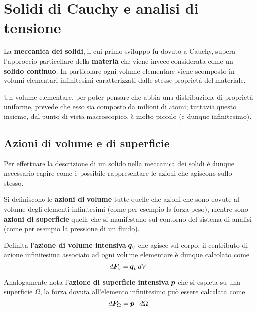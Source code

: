 \chapter{Solidi di Cauchy e analisi di tensione}
	
	La \textbf{meccanica dei solidi}, il cui primo sviluppo fu dovuto a Cauchy, supera l'approccio particellare della \textbf{materia} che viene invece considerata come un \textbf{solido continuo}. In particolare ogni volume elementare viene scomposto in volumi elementari infinitesimi caratterizzati dalle stesse proprietà del materiale.
	
	\begin{nota}
		Un volume elementare, per poter pensare che abbia una distribuzione di proprietà uniforme, prevede che esso sia composto da milioni di atomi; tuttavia questo insieme, dal punto di vista macroscopico, è molto piccolo (e dunque infinitesimo).
	\end{nota}

\section{Azioni di volume e di superficie}
	Per effettuare la descrizione di un solido nella meccanica dei solidi è dunque necessario capire come è possibile rappresentare le azioni che agiscono sullo stesso.
	\begin{concetto}
		Si definiscono le \textbf{azioni di volume} tutte quelle che azioni che sono dovute al volume degli elementi infinitesimi (come per esempio la forza peso), mentre sono \textbf{azioni di superficie} quelle che si manifestano sul contorno del sistema di analisi (come per esempio la pressione di un fluido).
		
		\vspace{3mm}
		
		Definita l'\textbf{azione di volume intensiva} $\boldsymbol{q}_v$ che agisce sul corpo, il contributo di azione infinitesima associato ad ogni volume elementare è dunque calcolato come
		\begin{equation}
			d\boldsymbol{F}_v = \boldsymbol{q}_v \, dV
		\end{equation}
		
		Analogamente nota l'\textbf{azione di superficie intensiva} $\boldsymbol{p}$ che si espleta su una superficie $\Omega$, la forza dovuta all'elemento infinitesimo può essere calcolata come
		\begin{equation}
			d\boldsymbol{F}_\Omega= \boldsymbol{p} \cdot d\Omega
		\end{equation}
	\end{concetto}

